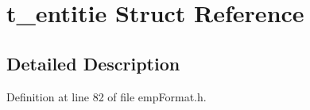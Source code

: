 \hypertarget{structt__entitie}{}\section{t\+\_\+entitie Struct Reference}
\label{structt__entitie}


\subsection{Detailed Description}


Definition at line 82 of file emp\+Format.\+h.

